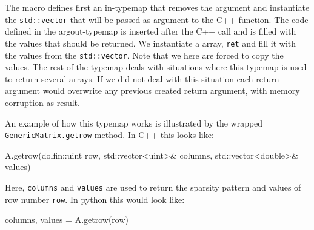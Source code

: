 \begin{code}
The macro defines first an in-typemap that removes the argument and instantiate the \texttt{std::vector} that will be passed as argument to the C++ function. The code defined in the argout-typemap is inserted after the C++ call and is filled with the values that should be returned. We instantiate a \numpy array, \texttt{ret} and fill it with the values from the \texttt{std::vector}. Note that we here are forced to copy the values. The rest of the typemap deals with situations where this typemap is used to return several \numpy arrays. If we did not deal with this situation each return argument would overwrite any previous created return argument, with memory corruption as result.\par

An example of how this typemap works is illustrated by the wrapped \texttt{GenericMatrix.getrow} method. In C++ this looks like:
\begin{code}
A.getrow(dolfin::uint row, std::vector<uint>& columns, std::vector<double>& values)
\end{code}
Here, \texttt{columns} and \texttt{values} are used to return the sparsity pattern and values of row number \texttt{row}. In python this would look like:
\begin{code}
columns, values = A.getrow(row)
\end{code}


\end{code}
